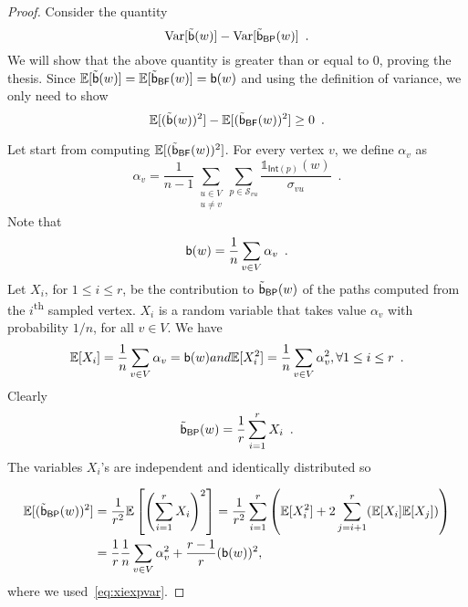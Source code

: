 \begin{proof}
  Consider the quantity
  \[
  \mathrm{Var}[\tilde{\mathsf{b}}(w)]-\mathrm{Var}[\tilde{\mathsf{b}}_\mathsf{BP}(w)]\enspace.\]
  We will show that the above quantity is greater than or equal to 0, proving
  the thesis.
  Since
  $\mathbb{E}[\tilde{\mathsf{b}}(w)]=\mathbb{E}[\tilde{\mathsf{b}}_\mathsf{BF}(w)]=\mathsf{b}(w)$
  and using the definition of variance, we only need to show 
  \begin{equation}\label{eq:inequal}
    \exp[(\tilde\betw(w))^2]-\exp[(\tilde\betw_\mathsf{BF}(w))^2]\ge
    0\enspace.
  \end{equation}

  Let start from computing $\mathbb{E}[(\tilde{\mathsf{b}}_\mathsf{BF}(w))^2]$. For every
  vertex $v$, we define $\alpha_v$ as
  \[
  \alpha_v=\frac{1}{n-1}\sum_{\substack{u\in V
  \\u\neq
  v}}\sum_{p\in\mathcal{S}_{vu}}\frac{\mathds{1}_{\mathsf{Int}(p)}(w)}{\sigma_{vu}}\enspace.
  \]
  Note that 
  \begin{equation}\label{eq:betwalpha}
    \betw(w)=\frac{1}{n}\sum_{v\in V}\alpha_v\enspace.
  \end{equation}
  Let $X_i$, for $1\le i \le r$, be the contribution to $\tilde{\mathsf{b}}_\mathsf{BP}(w)$
  of the paths computed from the $i$\textsuperscript{th} sampled vertex. $X_i$
  is a random variable that takes value $\alpha_v$ with probability $1/n$, for
  all $v\in V$. We have
  \begin{equation}\label{eq:xiexpvar}
	\exp[X_i]=\frac{1}{n}\sum_{v\in V}\alpha_v=\betw(w) \mbox{ and }
    \exp[X_i^2]=\frac{1}{n}\sum_{v\in V}\alpha_v^2, \forall 1\le i\le r\enspace.
  \end{equation}
  Clearly
  \[
  \tilde{\mathsf{b}}_\mathsf{BP}(w)=\frac{1}{r}\sum_{i=1}^r X_i\enspace.
  \]
  The variables $X_i$'s are independent and identically distributed so


  \begin{align}\label{eq:expxisquared}
    \exp[(\tilde\betw_\mathsf{BP}(w))^2]&=\frac{1}{r^2}\exp\left[\left(\sum_{i=1}^rX_i\right)^2\right]=\frac{1}{r^2}\sum_{i=1}^r\left(\exp[X_i^2]+2\sum_{j=i+1}^r(\exp[X_i]\exp[X_j])\right)\nonumber\\
	&=\frac{1}{r}\frac{1}{n}\sum_{v\in V}\alpha_v^2+\frac{r-1}{r}(\betw(w))^2,
\end{align}
where we used~\eqref{eq:xiexpvar}.


\end{proof}

